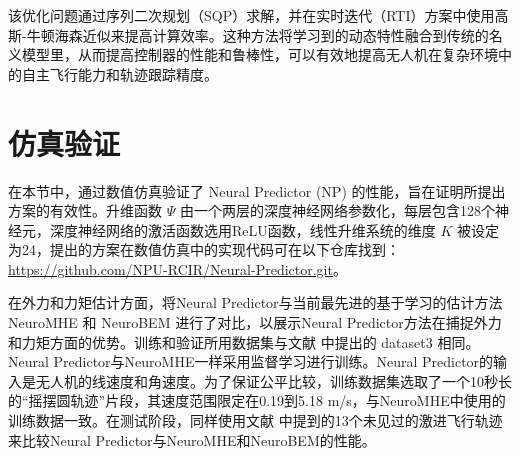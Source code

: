 \documentclass[lang=chs, degree=master, blindreview=true, winfonts=true]{yanputhesis}
\begin{document}
该优化问题通过序列二次规划（SQP）求解，并在实时迭代（RTI）方案中使用高斯-牛顿海森近似来提高计算效率。这种方法将学习到的动态特性融合到传统的名义模型里，从而提高控制器的性能和鲁棒性，可以有效地提高无人机在复杂环境中的自主飞行能力和轨迹跟踪精度。

\section{仿真验证}


在本节中，通过数值仿真验证了 Neural Predictor (NP) 的性能，旨在证明所提出方案的有效性。升维函数 $\Psi$ 由一个两层的深度神经网络参数化，每层包含128个神经元，深度神经网络的激活函数选用ReLU函数，线性升维系统的维度 $K$ 被设定为24，提出的方案在数值仿真中的实现代码可在以下仓库找到：\href{https://github.com/NPU-RCIR/Neural-Predictor.git}{https://github.com/NPU-RCIR/Neural-Predictor.git}。

在外力和力矩估计方面，将Neural Predictor与当前最先进的基于学习的估计方法NeuroMHE \cite{Wang2024e} 和 NeuroBEM \cite{Bauersfeld2021} 进行了对比，以展示Neural Predictor方法在捕捉外力和力矩方面的优势。训练和验证所用数据集与文献  中提出的 dataset3 相同。Neural Predictor与NeuroMHE一样采用监督学习进行训练。Neural Predictor的输入是无人机的线速度和角速度。为了保证公平比较，训练数据集选取了一个10秒长的“摇摆圆轨迹”片段，其速度范围限定在0.19到5.18 m/s，与NeuroMHE中使用的训练数据一致。在测试阶段，同样使用文献  中提到的13个未见过的激进飞行轨迹来比较Neural Predictor与NeuroMHE和NeuroBEM的性能。
\end{document}
